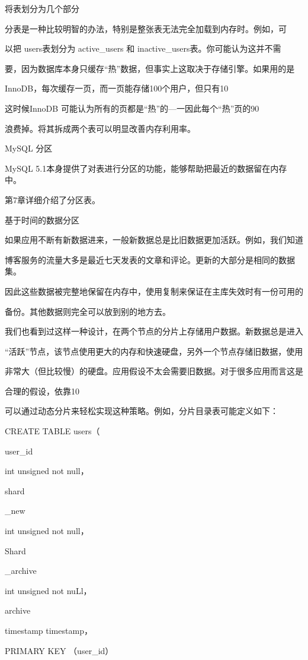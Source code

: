 将表划分为几个部分

分表是一种比较明智的办法，特别是整张表无法完全加载到内存时。例如，可

以把 users表划分为 active\_users 和 inactive\_users表。你可能认为这并不需

要，因为数据库本身只缓存“热”数据，但事实上这取决于存储引擎。如果用的是

InnoDB，每次缓存一页，而一页能存储100个用户，但只有10%

这时候InnoDB 可能认为所有的页都是“热”的—一因此每个“热”页的90%

浪费掉。将其拆成两个表可以明显改善内存利用率。

MySQL 分区

MySQL 5.1本身提供了对表进行分区的功能，能够帮助把最近的数据留在内存中。

第7章详细介绍了分区表。

基于时间的数据分区

如果应用不断有新数据进来，一般新数据总是比旧数据更加活跃。例如，我们知道

博客服务的流量大多是最近七天发表的文章和评论。更新的大部分是相同的数据集。

因此这些数据被完整地保留在内存中，使用复制来保证在主库失效时有一份可用的

备份。其他数据则完全可以放到别的地方去。

我们也看到过这样一种设计，在两个节点的分片上存储用户数据。新数据总是进入

“活跃”节点，该节点使用更大的内存和快速硬盘，另外一个节点存储旧数据，使用

非常大（但比较慢）的硬盘。应用假设不太会需要旧数据。对于很多应用而言这是

合理的假设，依靠10%

可以通过动态分片来轻松实现这种策略。例如，分片目录表可能定义如下：

CREATE TABLE users（

user\_id

int unsigned not null，

shard

\_new

int unsigned not null，

Shard

\_archive

int unsigned not nuLl，

archive

timestamp timestamp，

PRIMARY KEY （user\_id）

